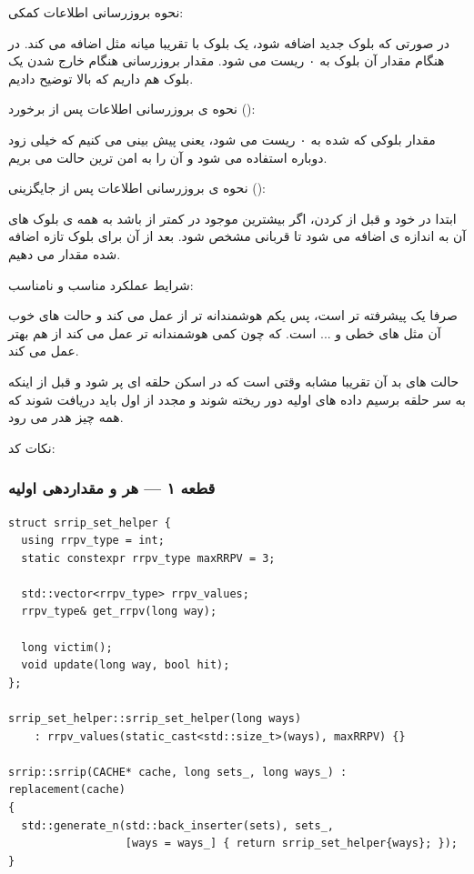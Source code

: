 \documentclass[12pt,a4paper]{article}
\begin{document}
نحوه بروزرسانی اطلاعات کمکی:

در صورتی که بلوک جدید اضافه شود، یک بلوک با  تقریبا میانه مثل  اضافه می کند. در هنگام  مقدار  آن بلوک به ۰ ریست می شود. مقدار بروزرسانی هنگام خارج شدن یک بلوک هم داریم که بالا توضیح دادیم.

نحوه ی بروزرسانی اطلاعات پس از برخورد ():

مقدار  بلوکی که  شده به ۰ ریست می شود، یعنی پیش بینی می کنیم که خیلی زود دوباره استفاده می شود و آن را به امن ترین حالت می بریم.

نحوه ی بروزرسانی اطلاعات پس از جایگزینی ():

ابتدا در خود  و قبل از  کردن، اگر بیشترین  موجود در  کمتر از  باشد به همه ی بلوک های آن  به اندازه ی  اضافه می شود تا قربانی مشخص شود. بعد از آن برای بلوک تازه اضافه شده مقدار  می دهیم.

شرایط عملکرد مناسب و نامناسب:

صرفا یک  پیشرفته تر است، پس یکم هوشمندانه تر از  عمل می کند و حالت های خوب آن مثل  های خطی و ... است. که چون کمی هوشمندانه تر عمل می کند از  هم بهتر عمل می کند.

حالت های بد آن تقریبا مشابه  وقتی است که در اسکن حلقه ای  پر شود و قبل از اینکه به سر حلقه برسیم داده های اولیه دور ریخته شوند و مجدد از اول باید دریافت شوند که همه چیز هدر می رود.

نکات کد:

\subsubsection{قطعه ۱ —  هر  و مقداردهی اولیه}

\begin{latin}
\begin{lstlisting}
struct srrip_set_helper {
  using rrpv_type = int;
  static constexpr rrpv_type maxRRPV = 3;

  std::vector<rrpv_type> rrpv_values;
  rrpv_type& get_rrpv(long way);

  long victim();
  void update(long way, bool hit);
};

srrip_set_helper::srrip_set_helper(long ways)
    : rrpv_values(static_cast<std::size_t>(ways), maxRRPV) {}

srrip::srrip(CACHE* cache, long sets_, long ways_) : replacement(cache)
{
  std::generate_n(std::back_inserter(sets), sets_,
                  [ways = ways_] { return srrip_set_helper{ways}; });
}
\end{lstlisting}
\end{latin}
\end{document}

